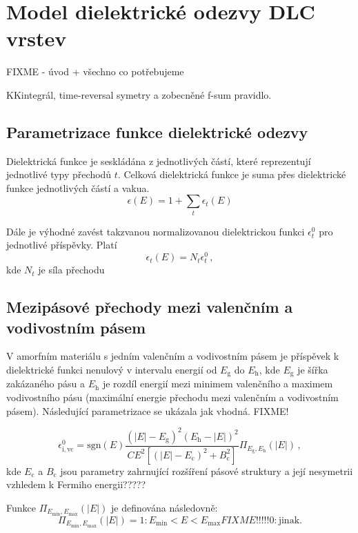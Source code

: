 \chapter{Model dielektrické odezvy DLC vrstev}

FIXME - úvod + všechno co potřebujeme 

KKintegrál, time-reversal symetry a zobecněné f-sum pravidlo.

\section{ Parametrizace funkce dielektrické  odezvy}
Dielektrická funkce je seskládána z jednotlivých částí, které reprezentují jednotlivé typy přechodů $t$. Celková dielektrická funkce je suma přes dielektrické funkce jednotlivých částí a vakua. \cite{sumrule1}
\begin{equation}
\epsilon(E) = 1 + \sum_t \epsilon_t(E)
\end{equation}

Dále je výhodné zavést takzvanou normalizovanou dielektrickou funkci $\epsilon_t^0$ pro jednotlivé příspěvky. Platí 
\begin{equation}
\epsilon_t(E) = N_t \epsilon_t^0  \, \mathrm{,}
\end{equation}
kde $N_t$ je síla přechodu  

\section{Mezipásové přechody mezi valenčním a vodivostním pásem}
V amorfním materiálu s jedním valenčním a vodivostním pásem je příspěvek k dielektrické funkci nenulový v intervalu energií od $E_\mathrm{g}$ do $E_\mathrm{h}$, kde $E_\mathrm{g}$ je šířka zakázaného pásu a $E_\mathrm{h}$ je rozdíl energií mezi minimem valenčního a maximem vodivostního pásu (maximální energie přechodu mezi valenčním a vodivostním pásem). Následující parametrizace se ukázala jak vhodná. FIXME!

\begin{equation}
\epsilon_\mathrm{i,vc}^0 = \mathrm{sgn}(E) \frac{(|E|- E_\mathrm{g})^2(E_\mathrm{h} - |E|)^2}{ C E^2 [(|E| - E_\mathrm{c})^2 + B_\mathrm{c}^2]} \Pi_{E_\mathrm{g},E_\mathrm{h}}(|E|) \, \mathrm{,}
\end{equation}
kde $E_\mathrm{c}$ a $B_\mathrm{c}$ jsou parametry zahrnující rozšíření pásové struktury a její nesymetrii vzhledem k Fermiho energii?????

Funkce $\Pi_{E_\mathrm{min},E_\mathrm{max}}(|E|)$ je definována následovně:
\begin{equation}
\Pi_{E_\mathrm{min},E_\mathrm{max}}(|E|) = 1 : E_\mathrm{min} < E < E_\mathrm{max}
 FIXME!!!!! 0 : \mathrm{jinak.}
\end{equation}




\cleardoublepage
